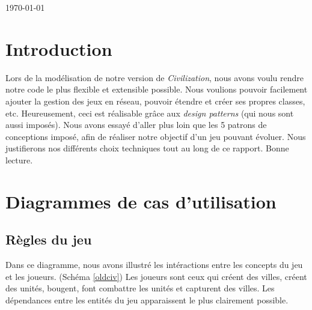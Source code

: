 \begin{titlepage}

{\large \today}\\[3cm] %


 

\vfill %

\end{titlepage}

\tableofcontents{}

\section{Introduction}

	Lors de la modélisation de notre version de \textit{Civilization}, nous avons voulu rendre notre code le plus flexible et extensible possible.
Nous voulions pouvoir facilement ajouter la gestion des jeux en réseau, pouvoir étendre et créer ses propres classes, etc.
Heureusement, ceci est réalisable grâce aux \textit{design patterns} (qui nous sont aussi imposés).
Nous avons essayé d'aller plus loin que les 5 patrons de conceptions imposé, afin de réaliser notre objectif d'un jeu pouvant évoluer. Nous justifierons nos différents choix techniques tout au long de ce rapport.
Bonne lecture.

\newpage

\section{Diagrammes de cas d'utilisation}
	\subsection{Règles du jeu}
		Dans ce diagramme, nous avons illustré les intéractions entre les concepts du jeu et les joueurs. (Schéma \ref{oldciv})
	Les joueurs sont ceux qui créent des villes, créent des unités, bougent, font combattre les unités et capturent des villes.
	Les dépendances entre les entités du jeu apparaissent le plus clairement possible.
	

